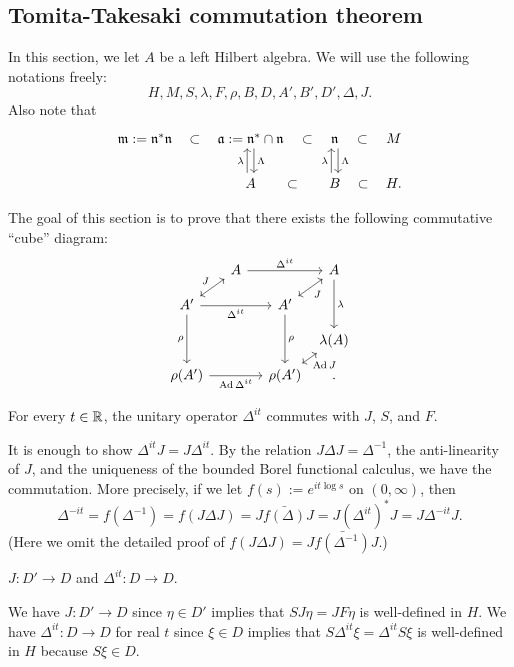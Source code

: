 \documentclass{../../../small}
\begin{document}
\subsection{Tomita-Takesaki commutation theorem}

In this section, we let $A$ be a left Hilbert algebra.
We will use the following notations freely:
\[H,M,S,\lambda,F,\rho,B,D,A',B',D',\Delta,J.\]
Also note that
\[\begin{tikzcd}
\fm:=\fn^*\fn \rar[phantom,"\subset"] & \fa:=\fn^*\cap\fn \rar[phantom,"\subset"]\dar[shift left]{\Lambda} & \fn \rar[phantom,"\subset"]\dar[shift left]{\Lambda} & M\\
& A \rar[phantom,"\subset"]\uar[shift left]{\lambda} & B \rar[phantom,"\subset"]\uar[shift left]{\lambda} & H.
\end{tikzcd}\]

The goal of this section is to prove that there exists the following commutative ``cube'' diagram:
\[\begin{tikzcd}[column sep={3.5em,between origins},row sep={2.5em,between origins}]
&A\ar{rr}{\Delta^{it}}&&A\ar{dd}{\lambda}\\
A'\ar[<->]{ur}{J}\ar[swap]{rr}{\Delta^{it}}\ar[swap]{dd}{\rho}&&A'\ar[<->,swap]{ur}{J}\ar{dd}{\rho}&\\
&&&\lambda(A)\\
\rho(A')\ar[swap]{rr}{\Ad\Delta^{it}}&&\rho(A')\ar[<->,swap]{ur}{\Ad J}&.
\end{tikzcd}\]


\begin{lem*}
For every $t\in\mathbb{R}$, the unitary operator $\Delta^{it}$ commutes with $J$, $S$, and $F$.
\end{lem*}
\begin{pf}
It is enough to show $\Delta^{it}J=J\Delta^{it}$.
By the relation $J\Delta J=\Delta^{-1}$, the anti-linearity of $J$, and the uniqueness of the bounded Borel functional calculus, we have the commutation.
More precisely, if we let $f(s):=e^{it\log s}$ on $(0,\infty)$, then
\[\Delta^{-it}=f(\Delta^{-1})=f(J\Delta J)=J\bar{f(\Delta)}J=J(\Delta^{it})^*J=J\Delta^{-it}J.\]
(Here we omit the detailed proof of $f(J\Delta J)=J\bar{f(\Delta^{-1})}J$.)
\end{pf}


\begin{lem*}
$J:D'\to D$ and $\Delta^{it}:D\to D$.
\end{lem*}
\begin{pf}
We have $J:D'\to D$ since $\eta\in D'$ implies that $SJ\eta=JF\eta$ is well-defined in $H$.
We have $\Delta^{it}:D\to D$ for real $t$ since $\xi\in D$ implies that $S\Delta^{it}\xi=\Delta^{it}S\xi$ is well-defined in $H$ because $S\xi\in D$.
\end{pf}
\end{document}
